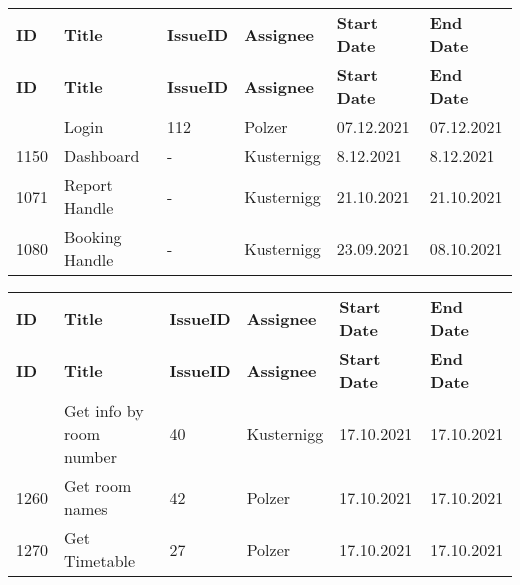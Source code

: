 \begin{longtable}{|p{}|p{}|p{}|p{}|p{}|p{}|} \hline
    \textbf{ID} & \textbf{Title} & \textbf{Issue\-ID} & \textbf{Assignee} & \textbf{Start Date} & \textbf{End \linebreak Date} \\ \hhline{|=|=|=|=|=|=|}
    \endfirsthead
    \hline
    \textbf{ID} & \textbf{Title} & \textbf{Issue\-ID} & \textbf{Assignee} & \textbf{Start Date} & \textbf{End \linebreak Date} \\ \hhline{|=|=|=|=|=|=|}
    \endhead
    1140 & Login & 112 & Polzer & 07.12.2021 & 07.12.2021 \\ \hline
    1150 & Dashboard & - & Kusternigg & 8.12.2021 & 8.12.2021 \\ \hline
    1071 & Report Handle & - & Kusternigg & 21.10.2021 & 21.10.2021 \\ \hline
    1080 & Booking Handle & - & Kusternigg & 23.09.2021 & 08.10.2021 \\ \hline
\end{longtable}


\begin{longtable}{|p{}|p{}|p{}|p{}|p{}|p{}|} \hline
    \textbf{ID} & \textbf{Title} & \textbf{Issue\-ID} & \textbf{Assignee} & \textbf{Start Date} & \textbf{End \linebreak Date} \\ \hhline{|=|=|=|=|=|=|}
    \endfirsthead
    \hline
    \textbf{ID} & \textbf{Title} & \textbf{Issue\-ID} & \textbf{Assignee} & \textbf{Start Date} & \textbf{End \linebreak Date} \\ \hhline{|=|=|=|=|=|=|}
    \endhead
    1180 & Get info by room number & 40 & Kusternigg & 17.10.2021 & 17.10.2021 \\ \hline
    1260 & Get room names & 42 & Polzer & 17.10.2021 & 17.10.2021 \\ \hline
    1270 & Get Timetable & 27 & Polzer & 17.10.2021 & 17.10.2021 \\ \hline
\end{longtable}

